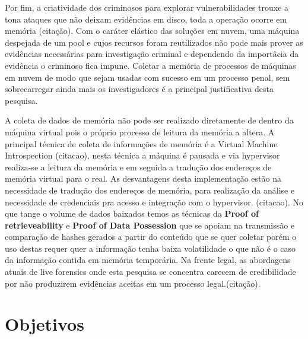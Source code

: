 \documentclass[
	12pt,				%
	openright,			%
	oneside,			%
	a4paper,			%
	english,			%
	french,				%
	spanish,			%
	brazil,				%
	]{abntex2}
\begin{document}
\par

Por fim, a criatividade dos criminosos para explorar vulnerabilidades trouxe a tona ataques que não deixam evidências em disco, toda a operação ocorre em memória (citação). Com o 
caráter elástico das soluções em nuvem, uma máquina despejada de um pool e cujos recursos foram reutilizados não pode mais prover as evidências necessárias para investigação criminal e 
dependendo da importâcia da evidência o criminoso fica impune. Coletar a memória de processos de máquinas em nuvem de modo que sejam usadas com sucesso em um processo penal, sem 
sobrecarregar ainda mais os investigadores é a principal justificativa desta pesquisa.

\par

A coleta de dados de memória não pode ser realizado diretamente de dentro da máquina virtual pois o próprio processo de leitura da memória a altera. A principal técnica de coleta
de informações de memória é a Virtual Machine Introspection (citacao), nesta técnica a máquina é pausada e via hypervisor realiza-se a leitura da memória e em seguida a tradução dos 
endereços de memória virtual para o real. As desvantagens desta implementação estão na necessidade de tradução dos endereços de memória, para realização da análise e necessidade de 
credenciais pra acesso e integração com o hypervisor. (citacao). No que tange o volume de dados baixados temos as técnicas da \textbf{Proof of retrieveability} 
e \textbf{Proof of Data Possession} que se apoiam na transmissão e comparação de hashes gerados a partir do conteúdo que se quer coletar porém o uso destas requer
quer a informação tenha baixa volatilidade o que não é o caso da informação contida em memória temporária. Na frente legal, as abordagens atuais de live forensics onde esta 
pesquisa se concentra carecem de credibilidade por não produzirem evidências aceitas em um processo legal.(citação).

\chapter{Objetivos}
\end{document}
